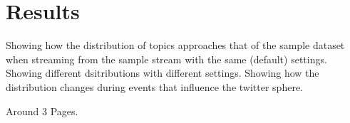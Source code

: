 \chapter{Results}
\label{ch:results}

Showing how the distribution of topics approaches that of the sample dataset when streaming from the sample stream with the same (default) settings.
Showing different dsitributions with different settings.
Showing how the distribution changes during events that influence the twitter sphere.

Around 3 Pages.
\pagebreak[3]
